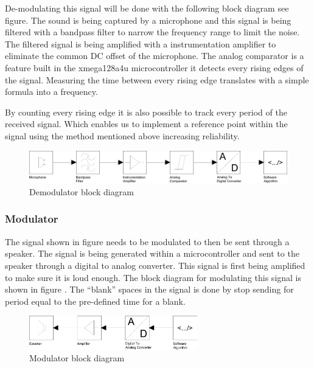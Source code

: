 \documentclass[10pt,a4paper]{article}
\begin{document}
De-modulating this signal will be done with the following block diagram see figure\cite{fig:demodulatorblock}. The sound is being captured by a microphone and this signal is being filtered with a bandpass filter to narrow the frequency range to limit the noise. The filtered signal is being amplified with a instrumentation amplifier to eliminate the common DC offset of the microphone. The analog comparator is a feature built in the xmega128a4u microcontroller it detects every rising edges of the signal. Measuring the time between every rising edge translates with a simple formula into a frequency.

By counting every rising edge it is also possible to track every period of the received signal. Which enables us to implement a reference point within the signal using the method mentioned above increasing reliability. 

 \begin{figure}[h]
     \centering
     \includegraphics[width=1\textwidth]{De-modulator.pdf}
     \caption{Demodulator block diagram }
     \label{fig:demodulatorblock}
 \end{figure}

\subsubsection{Modulator}
The signal shown in figure\cite{fig:Signal} needs to be modulated to then be sent through a speaker. The signal is being generated within a microcontroller and sent to the speaker through a digital to analog converter. This signal is first being amplified to make sure it is loud enough. The block diagram for modulating this signal is shown in figure \cite{fig:modulatorblock}. The “blank” spaces in the signal is done by stop sending for period equal to the pre-defined time for a blank.

\begin{figure}[H]
    \centering
    \includegraphics[width=0.65\textwidth]{Modulator.pdf}
    \caption{Modulator block diagram }
    \label{fig:modulatorblock}
\end{figure}
\end{document}
